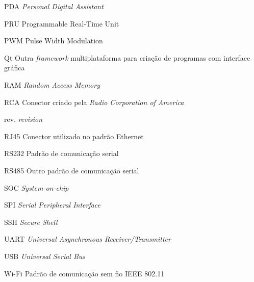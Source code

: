\begin{siglas}
	\item[PDA] \emph{Personal Digital Assistant}
	\item[PRU] Programmable Real-Time Unit
	\item[PWM] Pulse Width Modulation
	\item[Qt] Outra \emph{framework} multiplataforma para criação de programas com interface gráfica
	\item[RAM] \emph{Random Access Memory}
	\item[RCA] Conector criado pela \emph{Radio Corporation of America}
	\item[rev.] \emph{revision}
	\item[RJ45] Conector utilizado no padrão Ethernet
	\item[RS232] Padrão de comunicação serial
	\item[RS485] Outro padrão de comunicação serial
	\item[SOC] \emph{System-on-chip}
	\item[SPI] \emph{Serial Peripheral Interface}
	\item[SSH] \emph{Secure Shell}
	\item[UART] \emph{Universal Asynchronous Receiver/Transmitter}
	\item[USB] \emph{Universal Serial Bus}
	\item[Wi-Fi] Padrão de comunicação sem fio IEEE 802.11
\end{siglas}